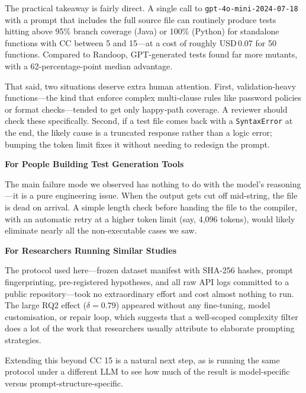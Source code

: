 The practical takeaway is fairly direct. A single call to \texttt{gpt-4o-mini-2024-07-18} with a prompt that includes the full source file can routinely produce tests hitting above 95\% branch coverage (Java) or 100\% (Python) for standalone functions with CC between 5 and 15---at a cost of roughly USD\,0.07 for 50 functions. Compared to Randoop, GPT-generated tests found far more mutants, with a 62-percentage-point median advantage.

That said, two situations deserve extra human attention. First, validation-heavy functions---the kind that enforce complex multi-clause rules like password policies or format checks---tended to get only happy-path coverage. A reviewer should check these specifically. Second, if a test file comes back with a \texttt{SyntaxError} at the end, the likely cause is a truncated response rather than a logic error; bumping the token limit fixes it without needing to redesign the prompt.

\textbf{For People Building Test Generation Tools}

The main failure mode we observed has nothing to do with the model's reasoning---it is a pure engineering issue. When the output gets cut off mid-string, the file is dead on arrival. A simple length check before handing the file to the compiler, with an automatic retry at a higher token limit (say, 4,096 tokens), would likely eliminate nearly all the non-executable cases we saw.

\textbf{For Researchers Running Similar Studies}

The protocol used here---frozen dataset manifest with SHA-256 hashes, prompt fingerprinting, pre-registered hypotheses, and all raw API logs committed to a public repository---took no extraordinary effort and cost almost nothing to run. The large RQ2 effect ($\delta = 0.79$) appeared without any fine-tuning, model customisation, or repair loop, which suggests that a well-scoped complexity filter does a lot of the work that researchers usually attribute to elaborate prompting strategies.

Extending this beyond CC 15 is a natural next step, as is running the same protocol under a different LLM to see how much of the result is model-specific versus prompt-structure-specific.
